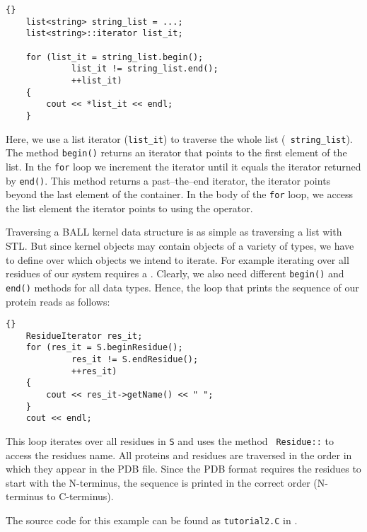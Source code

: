 \begin{lstlisting}{}
	list<string> string_list = ...;
	list<string>::iterator list_it;
	
	for (list_it = string_list.begin(); 
			 list_it != string_list.end();
			 ++list_it)
	{
		cout << *list_it << endl;
	}
\end{lstlisting}

\noindent
Here, we use a list iterator ({\tt list\_it}) to traverse the whole list ({\tt
string\_list}). The method {\tt begin()} returns an iterator that points to
the first element of the list. In the {\tt for} loop we increment the iterator
until it equals the iterator returned by {\tt end()}. This method returns a
past--the--end iterator, \ie the iterator points beyond the last element of
the container. In the body of the {\tt for} loop, we access the list element
the iterator points to using the {\tt *} operator.

Traversing a BALL kernel data structure is as simple as traversing a list with
STL. But since kernel objects may contain objects of a variety of types,
we have to define over which objects we intend to iterate.
For example iterating over all residues of our system requires a
. Clearly, we also need different {\tt begin()} and
{\tt end()} methods for all data types. Hence, the loop that prints the
sequence of our protein reads as follows:

\begin{lstlisting}{}
	ResidueIterator res_it;
	for (res_it = S.beginResidue(); 
			 res_it != S.endResidue();
			 ++res_it)
	{
		cout << res_it->getName() << " ";
	}
	cout << endl;
\end{lstlisting}

\noindent
This loop iterates over all residues in {\tt S} and uses the method {\tt
Residue::} to access the residues name. All proteins and
residues are traversed in the order in which they appear in the PDB file.
Since the PDB format requires the residues to start with the N-terminus,
the sequence is printed  in the correct order (N-terminus to C-terminus). 

\noindent
The source code for this example can be found as {\tt tutorial2.C} in
.
